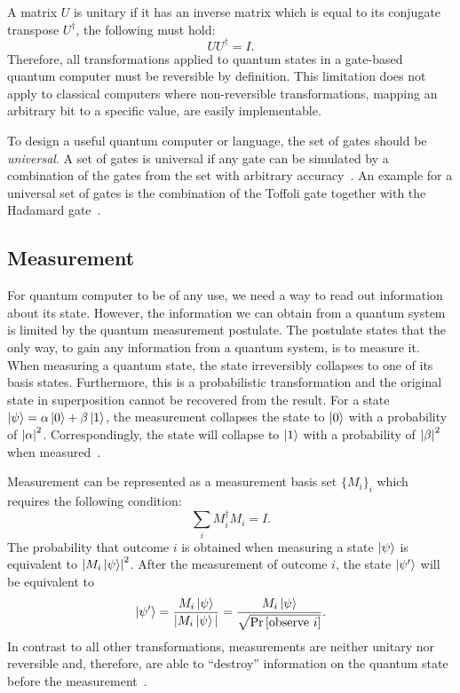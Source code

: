 A matrix $U$ is unitary if it has an inverse matrix which is equal to its conjugate transpose $U^\dagger$, \ie the following must hold:
\begin{equation*}
    U U^\dagger = I.
\end{equation*}
Therefore, all transformations applied to quantum states in a gate-based quantum computer must be reversible by definition. This limitation does not apply to classical computers where non-reversible transformations, \eg mapping an arbitrary bit to a specific value, are easily implementable. 

To design a useful quantum computer or language, the set of gates should be \emph{universal}. A set of gates is universal if any gate can be simulated by a combination of the gates from the set with arbitrary accuracy~\cite{BrBr01}. An example for a universal set of gates is the combination of the Toffoli gate together with the Hadamard gate~\cite{DiCh20a}.

\subsection{Measurement}
\label{sec:background_measurement}
For quantum computer to be of any use, we need a way to read out information about its state. However, the information we can obtain from a quantum system is limited by the quantum measurement postulate. The postulate states that the only way, to gain any information from a quantum system, is to measure it. When measuring a quantum state, the state irreversibly collapses to one of its basis states.
Furthermore, this is a probabilistic transformation and the original state in superposition cannot be recovered from the result. 
For a state $\ket{\psi} = \alpha \ket{0} + \beta \ket{1}$, the measurement collapses the state to $\ket{0}$ with a probability of $\abs{\alpha}^2$. Correspondingly, the state will collapse to $\ket{1}$ with a probability of $\abs{\beta}^2$ when measured~\cite{DiCh20a}.

Measurement can be represented as a measurement basis set $\{M_i\}_i$ which requires the following condition:
\begin{equation*}
    \sum_i M_i^\dagger M_i = I.
\end{equation*}
The probability that outcome $i$ is obtained when measuring a state $\ket{\psi}$ is equivalent to $\abs{M_i \ket{\psi}}^2$. After the measurement of outcome $i$, the state $\ket{\psi'}$ will be equivalent to
\begin{equation*}
    \ket{\psi'} = \frac{M_i \ket{\psi}}{|M_i \ket{\psi}|} = \frac{M_i \ket{\psi}}{\sqrt{\Probability{[\text{observe }i]}}}.
\end{equation*} 
In contrast to all other transformations, measurements are neither unitary nor reversible and, therefore, are able to ``destroy'' information on the quantum state before the measurement~\cite{DiCh20a}.


